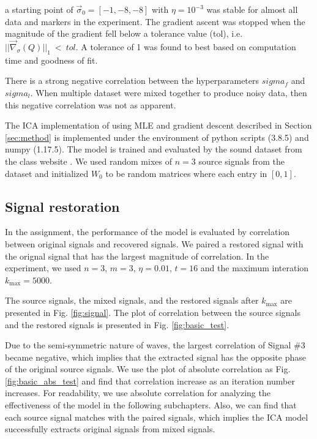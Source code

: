 \documentclass[conference]{IEEEtran}
\begin{document}
a starting point of $\Vec{\sigma}_0 = [-1,-8,-8]$ with $\eta=10^{-3}$ was stable for almost all data and markers in the experiment. The gradient ascent was stopped when the magnitude of the gradient fell below a tolerance value (tol), i.e. $||\Vec{\nabla}_\sigma(Q)||_1\ <\ tol$. A tolerance of 1 was found to best based on computation time and goodness of fit.

There is a strong negative correlation between the hyperparameters $sigma_f$ and $sigma_l$.
When multiple dataset were mixed together to produce noisy data, then this negative correlation was not as apparent.


The ICA implementation of using MLE and gradient descent described in Section \ref{sec:method} is implemented under the environment of python scripts (3.8.5) and numpy (1.17.5). The model is trained and evaluated by the sound dataset from the class website \cite{cs391}. We used random mixes of $n=3$ source signals from the dataset and initialized $W_0$ to be random matrices where each entry in $[0, 1]$.


\subsection{Signal restoration}

In the assignment, the performance of the model is evaluated by correlation between original signals and recovered signals. We paired a restored signal with the orignal signal that has the largest magnitude of correlation. In the experiment, we used $n=3$, $m=3$, $\eta=0.01$, $t=16$ and the maximum interation $k_{\text{max}} = 5000$.

The source signals, the mixed signals, and the restored signals after $k_{\text{max}}$ are presented in Fig. \ref{fig:signal}.
The plot of correlation between the source signals and the restored signals is presented in Fig. \ref{fig:basic_test}.

Due to the semi-symmetric nature of waves, the largest correlation of Signal \#3 became negative, which implies that the extracted signal has the opposite phase of the original source signals. We use the plot of absolute correlation as Fig. \ref{fig:basic_abs_test} and find that correlation increase as an iteration number increases. For readability, we use absolute correlation for analyzing the effectiveness of the model in the following subchapters. Also, we can find that each source signal matches with the paired signals, which implies the ICA model successfully extracts original signals from mixed signals.
\end{document}
